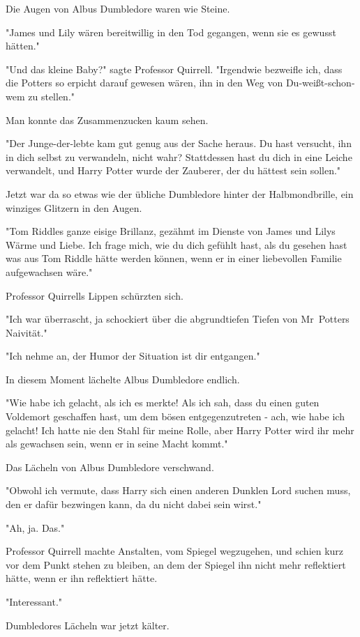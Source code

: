 {Die Augen von Albus Dumbledore waren wie Steine.

"James und Lily wären bereitwillig in den Tod gegangen, wenn sie es gewusst hätten."

"Und das kleine Baby?" sagte Professor Quirrell. "Irgendwie bezweifle ich, dass die Potters so erpicht darauf gewesen wären, ihn in den Weg von Du-weißt-schon-wem zu stellen."

Man konnte das Zusammenzucken kaum sehen.

"Der Junge-der-lebte kam gut genug aus der Sache heraus. Du hast versucht, ihn in dich selbst zu verwandeln, nicht wahr? Stattdessen hast du dich in eine Leiche verwandelt, und Harry Potter wurde der Zauberer, der du hättest sein sollen."

Jetzt war da so etwas wie der übliche Dumbledore hinter der Halbmondbrille, ein winziges Glitzern in den Augen.

"Tom Riddles ganze eisige Brillanz, gezähmt im Dienste von James und Lilys Wärme und Liebe. Ich frage mich, wie du dich gefühlt hast, als du gesehen hast was aus Tom Riddle hätte werden können, wenn er in einer liebevollen Familie aufgewachsen wäre."

Professor Quirrells Lippen schürzten sich.

"Ich war überrascht, ja schockiert über die abgrundtiefen Tiefen von Mr~Potters Naivität."

"Ich nehme an, der Humor der Situation ist dir entgangen."

In diesem Moment lächelte Albus Dumbledore endlich.

"Wie habe ich gelacht, als ich es merkte! Als ich sah, dass du einen guten Voldemort geschaffen hast, um dem bösen entgegenzutreten - ach, wie habe ich gelacht! Ich hatte nie den Stahl für meine Rolle, aber Harry Potter wird ihr mehr als gewachsen sein, wenn er in seine Macht kommt."

Das Lächeln von Albus Dumbledore verschwand.

"Obwohl ich vermute, dass Harry sich einen anderen Dunklen Lord suchen muss, den er dafür bezwingen kann, da du nicht dabei sein wirst."

"Ah, ja. Das."

Professor Quirrell machte Anstalten, vom Spiegel wegzugehen, und schien kurz vor dem Punkt stehen zu bleiben, an dem der Spiegel ihn nicht mehr reflektiert hätte, wenn er ihn reflektiert hätte.

"Interessant."

Dumbledores Lächeln war jetzt kälter.

}
